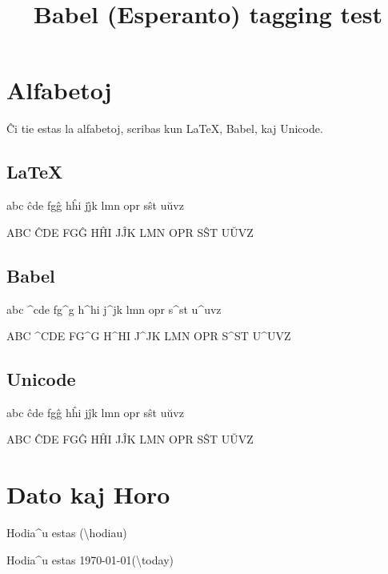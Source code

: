 \documentclass{article}
\title{Babel (Esperanto) tagging test}
\begin{document}
  
\section{Alfabetoj}
Ĉi tie estas la alfabetoj, scribas kun \LaTeX, Babel, kaj Unicode.

\subsection{LaTeX}
abc \^{c}de fg\^{g} h\^{h}i j\^{\j}k lmn opr s\^{s}t u\u{u}vz

ABC \^{C}DE FG\^{G} H\^{H}I J\^{J}K LMN OPR S\^{S}T U\u{U}VZ

\subsection{Babel}
abc ^cde fg^g h^hi j^jk lmn opr s^st u^uvz

ABC ^CDE FG^G H^HI J^JK LMN OPR S^ST U^UVZ

\subsection{Unicode}
abc ĉde fgĝ hĥi jĵk lmn opr sŝt uŭvz

ABC ĈDE FGĜ HĤI JĴK LMN OPR SŜT UŬVZ

\section{Dato kaj Horo}
Hodia^u estas \hodiau (\textbackslash hodiau)

Hodia^u estas \today (\textbackslash today)
\end{document}
